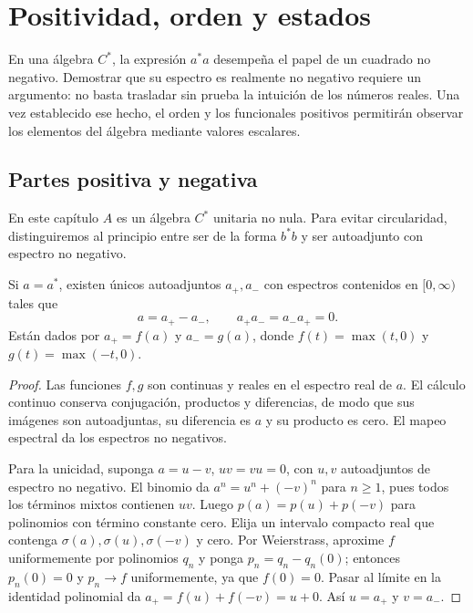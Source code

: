 \chapter{Positividad, orden y estados}\label{cap:v3-14}

En una álgebra $C^*$, la expresión $a^*a$ desempeña el papel de un cuadrado no negativo. Demostrar que su espectro es realmente no negativo requiere un argumento: no basta trasladar sin prueba la intuición de los números reales. Una vez establecido ese hecho, el orden y los funcionales positivos permitirán observar los elementos del álgebra mediante valores escalares.

\section{Partes positiva y negativa}\label{lec:v3-27}

En este capítulo $A$ es un álgebra $C^*$ unitaria no nula. Para evitar circularidad, distinguiremos al principio entre ser de la forma $b^*b$ y ser autoadjunto con espectro no negativo.

\begin{proposicion}\label{v3:partes-positivas}
Si $a=a^*$, existen únicos autoadjuntos $a_+,a_-$ con espectros contenidos en $[0,\infty)$ tales que
\[
 a=a_+-a_-,\qquad a_+a_-=a_-a_+=0.
\]
Están dados por $a_+=f(a)$ y $a_-=g(a)$, donde $f(t)=\max(t,0)$ y $g(t)=\max(-t,0)$.
\end{proposicion}
\begin{proof}
Las funciones $f,g$ son continuas y reales en el espectro real de $a$. El cálculo continuo conserva conjugación, productos y diferencias, de modo que sus imágenes son autoadjuntas, su diferencia es $a$ y su producto es cero. El mapeo espectral da los espectros no negativos.

Para la unicidad, suponga $a=u-v$, $uv=vu=0$, con $u,v$ autoadjuntos de espectro no negativo. El binomio da $a^n=u^n+(-v)^n$ para $n\ge1$, pues todos los términos mixtos contienen $uv$. Luego $p(a)=p(u)+p(-v)$ para polinomios con término constante cero. Elija un intervalo compacto real que contenga $\sigma(a),\sigma(u),\sigma(-v)$ y cero. Por Weierstrass, aproxime $f$ uniformemente por polinomios $q_n$ y ponga $p_n=q_n-q_n(0)$; entonces $p_n(0)=0$ y $p_n\to f$ uniformemente, ya que $f(0)=0$. Pasar al límite en la identidad polinomial da $a_+=f(u)+f(-v)=u+0$. Así $u=a_+$ y $v=a_-$.
\end{proof}

